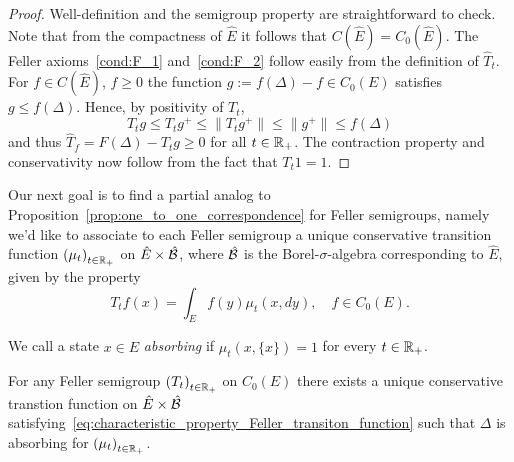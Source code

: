 \documentclass[../Master.tex]{subfiles}
\begin{document}
\begin{proof}
  Well-definition and the semigroup property are straightforward to check. Note that from the compactness of \(\hat{E}\) it follows that \(C(\hat{E}) = C_0(\hat{E})\). The Feller axioms~\ref{cond:F_1} and~\ref{cond:F_2} follow easily from the definition of \(\hat{T}_t\). For \(f \in C(\hat{E})\), \(f \ge 0\) the function \(g := f(\Delta) - f \in C_0(E)\) satisfies \(g \le f(\Delta)\). Hence, by positivity of \(T_t\),
  \begin{equation}
    T_t g \le T_t g^+ \le \lVert T_t g^+ \rVert \le \lVert g^+ \rVert \le f(\Delta)
  \end{equation}
  and thus \(\hat{T}_f = F(\Delta) - T_t g \ge 0\) for all \(t \in \mathbb{R}_+\). The contraction property and conservativity now follow from the fact that \(T_t 1 = 1\).
\end{proof}

Our next goal is to find a partial analog to Proposition~\ref{prop:one_to_one_correspondence} for Feller semigroups, namely we'd like to associate to each Feller semigroup a unique conservative transition function \({(\mu_t)}_{t \in \mathbb{R}_+}\) on \(\hat{E} \times \hat{\cal{B}}\), where \(\hat{\cal{B}}\) is the Borel-\(\sigma{}\)-algebra corresponding to \(\hat{E}\), given by the property
\begin{equation}\label{eq:characteristic_property_Feller_transiton_function}
  T_t f (x) = \int_E f(y) \mu_t(x,dy), \quad f \in C_0(E).
\end{equation}

We call a state \(x \in \hat{E}\) \emph{absorbing} if \(\mu_t(x, \{x\}) = 1\) for every \(t \in \mathbb{R}_+\).

\begin{proposition}[Existence]
  For any Feller semigroup \({(T_t)}_{t \in \mathbb{R}_+}\) on \(C_0(E)\) there exists a unique conservative transtion function on \(\hat{E} \times \hat{\cal{B}}\) satisfying~\eqref{eq:characteristic_property_Feller_transiton_function} such that \(\Delta{}\) is absorbing for \({(\mu_t)}_{t \in \mathbb{R}_+}\).
\end{proposition}
\end{document}
